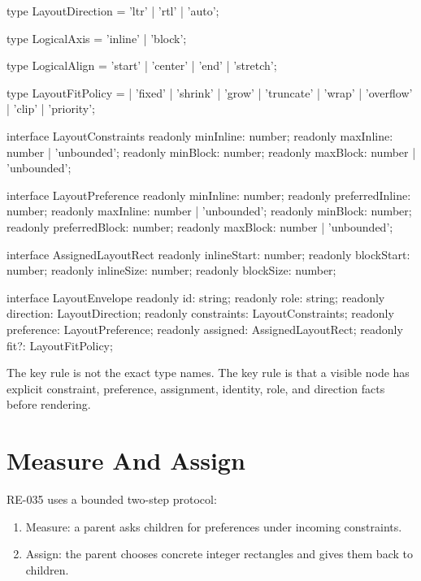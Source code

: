 \begin{CodeBlock}
type LayoutDirection = 'ltr' | 'rtl' | 'auto';

type LogicalAxis = 'inline' | 'block';

type LogicalAlign = 'start' | 'center' | 'end' | 'stretch';

type LayoutFitPolicy =
  | 'fixed'
  | 'shrink'
  | 'grow'
  | 'truncate'
  | 'wrap'
  | 'overflow'
  | 'clip'
  | 'priority';

interface LayoutConstraints {
  readonly minInline: number;
  readonly maxInline: number | 'unbounded';
  readonly minBlock: number;
  readonly maxBlock: number | 'unbounded';
}

interface LayoutPreference {
  readonly minInline: number;
  readonly preferredInline: number;
  readonly maxInline: number | 'unbounded';
  readonly minBlock: number;
  readonly preferredBlock: number;
  readonly maxBlock: number | 'unbounded';
}

interface AssignedLayoutRect {
  readonly inlineStart: number;
  readonly blockStart: number;
  readonly inlineSize: number;
  readonly blockSize: number;
}

interface LayoutEnvelope {
  readonly id: string;
  readonly role: string;
  readonly direction: LayoutDirection;
  readonly constraints: LayoutConstraints;
  readonly preference: LayoutPreference;
  readonly assigned: AssignedLayoutRect;
  readonly fit?: LayoutFitPolicy;
}
\end{CodeBlock}

The key rule is not the exact type names. The key rule is that a visible node has explicit constraint, preference, assignment, identity, role, and direction facts before rendering.

\section{Measure And Assign}\label{record-163-measure-and-assign}

RE-035 uses a bounded two-step protocol:

\begin{enumerate}
\def\labelenumi{\arabic{enumi}.}
\tightlist
\item
  Measure: a parent asks children for preferences under incoming constraints.
\item
  Assign: the parent chooses concrete integer rectangles and gives them back to children.
\end{enumerate}

